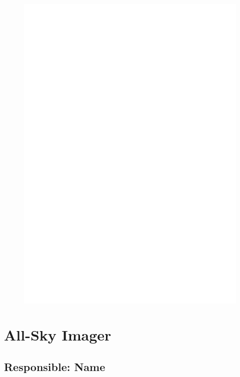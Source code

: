 \documentclass[a4paper, 10pt]{article}
\begin{document}
    
    \begin{figure}[H]
        \centering
        \includegraphics[width=14cm]{./figures/en_outfileScint_1.jpg}
    \end{figure} 
 

    \section{All-Sky Imager} 
 \subsection{Responsible: Name} 
 
\end{document}
